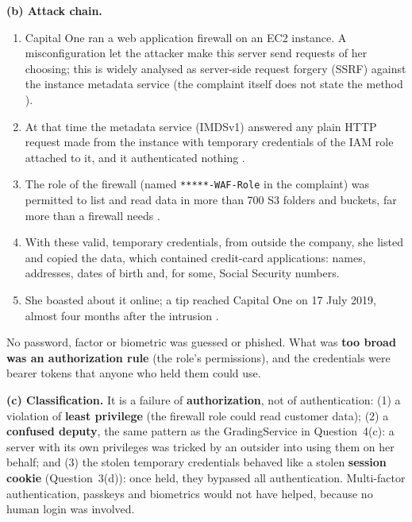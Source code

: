\documentclass[11pt,a4paper]{article}
\begin{document}
\textbf{(b) Attack chain.}
\begin{enumerate}
\item Capital One ran a web application firewall on an EC2 instance. A misconfiguration let the attacker make
this server send requests of her choosing; this is widely analysed as server-side request forgery (SSRF) against
the instance metadata service \cite{ssrf} (the complaint itself does not state the method \cite{fbicharge}).
\item At that time the metadata service (IMDSv1) answered any plain HTTP request made from the instance with
temporary credentials of the IAM role attached to it, and it authenticated nothing \cite{imds}.
\item The role of the firewall (named \texttt{*****-WAF-Role} in the complaint) was permitted to list and read data in
more than 700 S3 folders and buckets, far more than a firewall needs \cite{fbicharge}.
\item With these valid, temporary credentials, from outside the company, she listed and copied the data,
which contained credit-card applications: names, addresses, dates of birth and, for some, Social Security numbers.
\item She boasted about it online; a tip reached Capital One on 17 July 2019, almost four months after the
intrusion \cite{cap1sec}.
\end{enumerate}
No password, factor or biometric was guessed or phished. What was \textbf{too broad was an authorization rule}
(the role's permissions), and the credentials were bearer tokens that anyone who held them could use.

\textbf{(c) Classification.} It is a failure of \textbf{authorization}, not of authentication: (1) a violation of
\textbf{least privilege} (the firewall role could read customer data); (2) a \textbf{confused deputy}, the same
pattern as the GradingService in Question~4(c): a server with its own privileges was tricked by an outsider into
using them on her behalf; and (3) the stolen temporary credentials behaved like a stolen \textbf{session
cookie} (Question~3(d)): once held, they bypassed all authentication. Multi-factor authentication, passkeys and
biometrics would not have helped, because no human login was involved.
\end{document}
